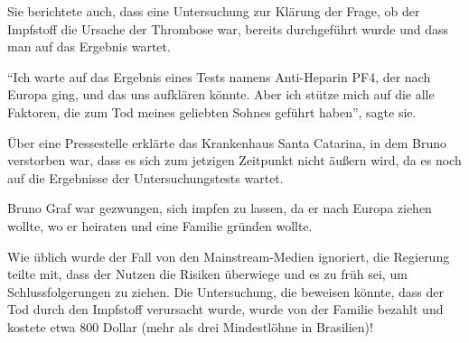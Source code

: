 Sie berichtete auch, dass eine Untersuchung zur Klärung der Frage, ob der
Impfstoff die Ursache der Thrombose war, bereits durchgeführt wurde und dass man
auf das Ergebnis wartet.

“Ich warte auf das Ergebnis eines Tests namens Anti-Heparin PF4, der nach Europa
ging, und das uns aufklären könnte. Aber ich stütze mich auf die alle Faktoren,
die zum Tod meines geliebten Sohnes geführt haben”, sagte sie.

Über eine Pressestelle erklärte das Krankenhaus Santa Catarina, in dem Bruno
verstorben war, dass es sich zum jetzigen Zeitpunkt nicht äußern wird, da es
noch auf die Ergebnisse der Untersuchungstests wartet.

Bruno Graf war gezwungen, sich impfen zu lassen, da er nach Europa ziehen
wollte, wo er heiraten und eine Familie gründen wollte.

Wie üblich wurde der Fall von den Mainstream-Medien ignoriert, die Regierung
teilte mit, dass der Nutzen die Risiken überwiege und es zu früh sei, um
Schlussfolgerungen zu ziehen. Die Untersuchung, die beweisen könnte, dass der
Tod durch den Impfstoff verursacht wurde, wurde von der Familie bezahlt und
kostete etwa 800 Dollar (mehr als drei Mindestlöhne in Brasilien)!
